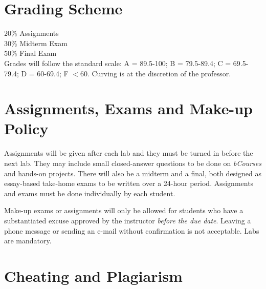 \documentclass[letterpaper]{inzane_syllabus} %
\begin{document}
\vspace{0.5cm}
\section{Grading Scheme}

20\% Assignments \\
30\% Midterm Exam \\
50\% Final Exam \\

Grades will follow the standard scale: A = 89.5-100; B = 79.5-89.4; C = 69.5-79.4; D = 60-69.4; F  $<$60. Curving is at the discretion of the professor. 



\newpage %

\makeSide %


\vspace{0.5cm}
\section{Assignments, Exams and Make-up Policy}

Assignments will be given after each lab and they must be turned in before the next lab. They may include small closed-answer questions to be done on \emph{bCourses} and hands-on projects. There will also be a midterm  and a final, both designed as essay-based take-home exams to be written over a 24-hour period. Assignments and exams must be done individually by each student.

Make-up exams or assignments will only be allowed for students who have a substantiated excuse approved by the instructor \emph{before the due date}. Leaving a phone message or sending an e-mail without confirmation is not acceptable. Labs are mandatory.

\vspace{0.5cm}
\section{Cheating and Plagiarism}
\end{document}
